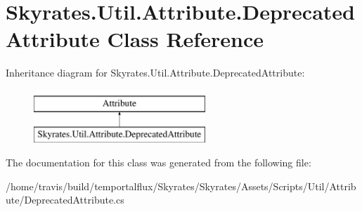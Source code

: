 \hypertarget{class_skyrates_1_1_util_1_1_attribute_1_1_deprecated_attribute}{\section{Skyrates.\-Util.\-Attribute.\-Deprecated\-Attribute Class Reference}
\label{class_skyrates_1_1_util_1_1_attribute_1_1_deprecated_attribute}
}
Inheritance diagram for Skyrates.\-Util.\-Attribute.\-Deprecated\-Attribute\-:\begin{figure}[H]
\begin{center}
\leavevmode
\includegraphics[height=2.000000cm]{class_skyrates_1_1_util_1_1_attribute_1_1_deprecated_attribute}
\end{center}
\end{figure}


The documentation for this class was generated from the following file\-:\begin{DoxyCompactItemize}
\item 
/home/travis/build/temportalflux/\-Skyrates/\-Skyrates/\-Assets/\-Scripts/\-Util/\-Attribute/Deprecated\-Attribute.\-cs\end{DoxyCompactItemize}
